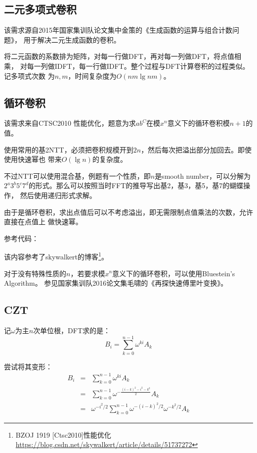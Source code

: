 \subsection{二元多项式卷积}
该需求源自2015年国家集训队论文集中金策的《生成函数的运算与组合计数问题》，
用于解决二元生成函数的卷积。

将二元函数的系数排为矩阵，对每一行做DFT，再对每一列做DFT，将点值相乘，
对每一列做IDFT，每一行做IDFT。整个过程与DFT计算卷积的过程类似。记多项式次数
为$n,m$，时间复杂度为$O(nm\lg nm)$。
\subsection{循环卷积}
该需求来自CTSC2010 性能优化，题意为求$ab^C$在模$x^n$意义下的循环卷积模$n+1$的值。

使用常用的基2NTT，必须把卷积规模开到$2n$，然后每次把溢出部分加回去。即使使用快速幂也
带来$O(\lg n)$的复杂度。

不过NTT可以使用混合基，例题有一个性质，即$n$是smooth number，可以分解为
$2^a3^b5^c7^d$的形式。那么可以按照当时FFT的推导写出基2，基3，基5，基7的蝴蝶操作，
然后使用递归形式求解。


由于是循环卷积，求出点值后可以不考虑溢出，即无需限制点值乘法的次数，允许直接在点值上
做快速幂。

参考代码：


该内容参考了skywalkert的博客\footnote{
    BZOJ 1919 [Ctsc2010]性能优化\\
    \url{https://blog.csdn.net/skywalkert/article/details/51737272}
}。

对于没有特殊性质的$n$，若要求模$x^n$意义下的循环卷积，可以使用Bluestein’s Algorithm。
参见国家集训队2016论文集毛啸的《再探快速傅里叶变换》。

\subsection{CZT}
记$\omega$为主$n$次单位根，DFT求的是：
\begin{displaymath}
    B_i=\sum_{k=0}^{n-1}{\omega^{ki}A_k}
\end{displaymath}

尝试将其变形：
\begin{eqnarray*}
    B_i&=&\sum_{k=0}^{n-1}{\omega^{ki}A_k}\\
    &=&\sum_{k=0}^{n-1}{\omega^{-\frac{(i-k)^2-i^2-k^2}{2}}A_k}\\
    &=&\omega^{-i^2/2}\sum_{k=0}^{n-1}{\omega^{-(i-k)^2/2}\omega^{-k^2/2}A_k}
\end{eqnarray*}

